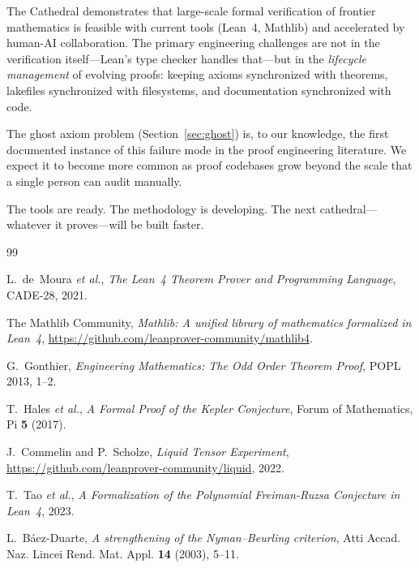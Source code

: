 \documentclass[11pt,a4paper]{article}
\begin{document}
The Cathedral demonstrates that large-scale formal verification of
frontier mathematics is feasible with current tools (Lean~4, Mathlib)
and accelerated by human-AI collaboration. The primary engineering
challenges are not in the verification itself---Lean's type checker
handles that---but in the \emph{lifecycle management} of evolving
proofs: keeping axioms synchronized with theorems, lakefiles
synchronized with filesystems, and documentation synchronized with
code.

The ghost axiom problem (Section~\ref{sec:ghost}) is, to our
knowledge, the first documented instance of this failure mode in the
proof engineering literature. We expect it to become more common as
proof codebases grow beyond the scale that a single person can audit
manually.

The tools are ready. The methodology is developing. The next
cathedral---whatever it proves---will be built faster.




\begin{thebibliography}{99}

L.~de~Moura \emph{et al.}, \emph{The Lean~4 Theorem Prover and Programming
Language}, CADE-28, 2021.

The Mathlib Community, \emph{Mathlib: A unified library of mathematics
formalized in Lean~4}, \url{https://github.com/leanprover-community/mathlib4}.

G.~Gonthier, \emph{Engineering Mathematics: The Odd Order Theorem Proof},
POPL 2013, 1--2.

T.~Hales \emph{et al.}, \emph{A Formal Proof of the Kepler Conjecture},
Forum of Mathematics, Pi \textbf{5} (2017).

J.~Commelin and P.~Scholze, \emph{Liquid Tensor Experiment},
\url{https://github.com/leanprover-community/liquid}, 2022.

T.~Tao \emph{et al.}, \emph{A Formalization of the Polynomial
Freiman-Ruzsa Conjecture in Lean~4}, 2023.

L.~B\'aez-Duarte, \emph{A strengthening of the Nyman--Beurling criterion},
Atti Accad. Naz. Lincei Rend. Mat. Appl. \textbf{14} (2003), 5--11.

\end{thebibliography}
\end{document}
